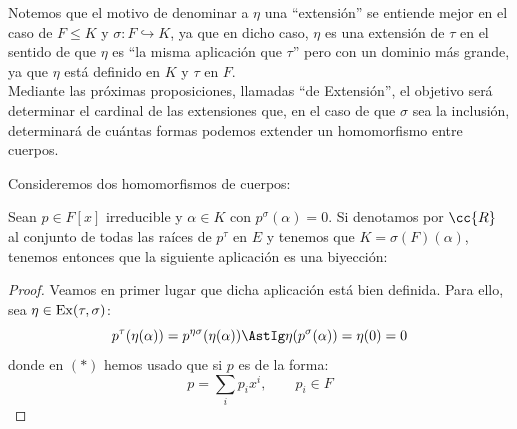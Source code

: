 Notemos que el motivo de denominar a $\eta$ una ``extensión'' se entiende mejor en el caso de $F\leq K$ y $\sigma:F\hookrightarrow K$, ya que en dicho caso, $\eta$ es una extensión de $\tau$ en el sentido de que $\eta$ es ``la misma aplicación que $\tau$'' pero con un dominio más grande, ya que $\eta$ está definido en $K$ y $\tau$ en $F$.\\

Mediante las próximas proposiciones, llamadas ``de Extensión'', el objetivo será determinar el cardinal de las extensiones que, en el caso de que $\sigma$ sea la inclusión, determinará de cuántas formas podemos extender un homomorfismo entre cuerpos.

\begin{prop}[Extensión I]%
    Consideremos dos homomorfismos de cuerpos:
    \begin{figure}[H]
        \centering
    \end{figure}
    \noindent
    Sean $p\in F[x]$ irreducible y $\alpha\in K$ con $p^{\sigma}(\alpha)=0$. Si denotamos por $\cc{R}$ al conjunto de todas las raíces de $p^\tau$ en $E$ y tenemos que $K = \sigma(F)(\alpha)$, tenemos entonces que la siguiente aplicación es una biyección:
    \begin{proof}
        Veamos en primer lugar que dicha aplicación está bien definida. Para ello, sea $\eta \in \operatorname{Ex}(\tau, \sigma)$:
        \begin{equation*}
            p^\tau(\eta(\alpha)) = p^{\eta \sigma}(\eta (\alpha)) \AstIg \eta(p^\sigma(\alpha)) = \eta(0) = 0
        \end{equation*}
        donde en $(\ast)$ hemos usado que si $p$ es de la forma:
        \begin{equation*}
            p = \sum_i p_i x^i, \qquad p_i \in F
        \end{equation*}


\end{proof}
\end{prop}
